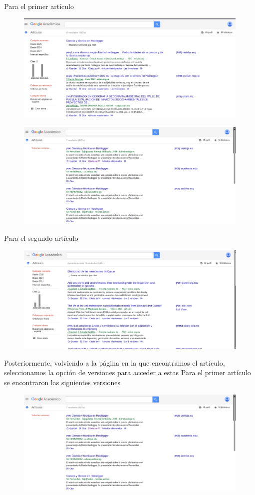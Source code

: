 \documentclass[12pt]{exam}
\begin{document}
Para el primer artículo
\begin{figure}[H]
    \centering
    \includegraphics[width=0.8\linewidth]{heidegger citas.png}
    \label{}
\end{figure}
\begin{figure}[H]
    \centering
    \includegraphics[width=0.8\linewidth]{Heidegger citas 2.png}
    \label{}
\end{figure}
Para el segundo artículo
\begin{figure}[H]
    \centering
    \includegraphics[width=0.8\linewidth]{biofisica citas.png}
    \label{}
\end{figure}
Posteriormente, volviendo a la página en la que encontramos el artículo, seleccionamos la opción de versiones para acceder a estas
Para el primer artículo se encontraron las siguientes versiones
\begin{figure}[H]
    \centering
    \includegraphics[width=0.8\linewidth]{heidegger versiones.png}
    \label{}
\end{figure}
\end{document}

